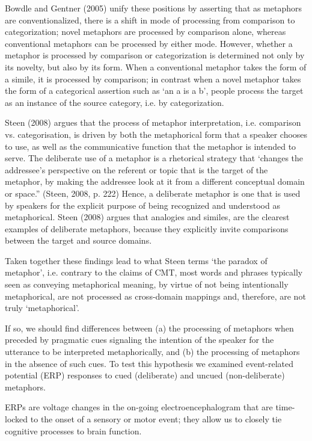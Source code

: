 \documentclass[]{article}
\begin{document}
	Bowdle and Gentner (2005) unify these positions by asserting that as metaphors are conventionalized, there is a shift in mode of processing from comparison to categorization; novel metaphors are processed by comparison alone, whereas conventional metaphors can be processed by either mode.  However, whether a metaphor is processed by comparison or categorization is determined not only by its novelty, but also by its form.  When a conventional metaphor takes the form of a simile, it is processed by comparison; in contrast when a novel metaphor takes the form of a categorical assertion such as ‘an a is a b’, people process the target as an instance of the source category, i.e. by categorization.
	
	Steen (2008) argues that the process of metaphor interpretation, i.e. comparison vs. categorisation, is driven by both the metaphorical form that a speaker chooses to use, as well as the communicative function that the metaphor is intended to serve.
	The deliberate use of a metaphor is a rhetorical strategy that ‘changes the addressee’s perspective on the referent or topic that is the target of the metaphor, by making the addressee look at it from a different conceptual domain or space.” (Steen, 2008, p. 222)
	Hence, a deliberate metaphor is one that is used by speakers for the explicit purpose of being recognized and understood as metaphorical.
	Steen (2008) argues that analogies and similes, are the clearest examples of deliberate metaphors, because they explicitly invite comparisons between the target and source domains. 
	
	Taken together these findings lead to what Steen terms ‘the paradox of metaphor’, i.e. contrary to the claims of CMT, most words and phrases typically seen as conveying metaphorical meaning, by virtue of not being intentionally metaphorical, are not processed as cross-domain mappings and, therefore, are not truly ‘metaphorical’. 
	
	If so, we should find differences between (a) the processing of metaphors when preceded by pragmatic cues signaling the intention of the speaker for the utterance to be interpreted metaphorically, and (b) the processing of metaphors in the absence of such cues. 
	To test this hypothesis we examined event-related potential (ERP) responses to cued (deliberate) and uncued (non-deliberate) metaphors.
	
	ERPs are voltage changes in the on-going electroencephalogram that are time-locked to the onset of a sensory or motor event; they allow us to closely tie cognitive processes to brain function.
	
\end{document}
